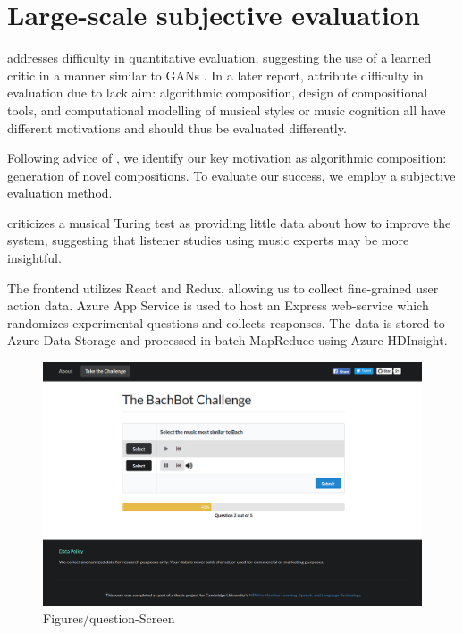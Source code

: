 \documentclass[dissertation.tex]{subfiles}
\begin{document}
\chapter{Large-scale subjective evaluation}

\cite{pearce2001towards} addresses difficulty in quantitative evaluation,
suggesting the use of a learned critic in a manner similar to GANs
\cite{goodfellow2014generative}. In a later report,
\cite{pearce2002motivations} attribute difficulty in evaluation due to lack
aim: algorithmic composition, design of compositional tools, and computational
modelling of musical styles or music cognition all have different motivations
and should thus be evaluated differently.

Following advice of \cite{pearce2002motivations}, we identify our key
motivation as algorithmic composition: generation of novel compositions.
To evaluate our success, we employ a subjective evaluation method.

\cite{ariza2009} criticizes a musical Turing test as providing little data about
how to improve the system, suggesting that listener studies using music experts
may be more insightful.

The frontend utilizes React and Redux, allowing us to collect fine-grained user
action data. Azure App Service is used to host an Express web-service which
randomizes experimental questions and collects responses. The data is stored to
Azure Data Storage and processed in batch MapReduce using Azure HDInsight.

\begin{figure}[htpb]
  \centering
  \includegraphics[width=1.0\linewidth]{Figures/question-screen.png}
  \caption{Figures/question-Screen}
  \label{fig:Figures/question-screen}
\end{figure}
\end{document}
